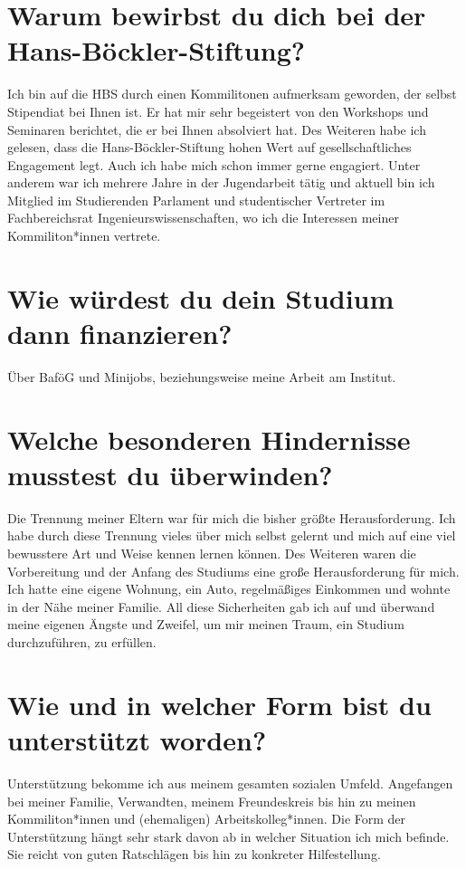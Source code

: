 \documentclass[12pt]{scrreprt}
\begin{document}
\section*{Warum bewirbst du dich bei der Hans-Böckler-Stiftung?}
Ich bin auf die HBS durch einen Kommilitonen aufmerksam geworden, der selbst Stipendiat
bei Ihnen ist. Er hat mir sehr begeistert von den Workshops und Seminaren berichtet, die er
bei Ihnen absolviert hat. Des Weiteren habe ich gelesen, dass die Hans-Böckler-Stiftung hohen
Wert auf gesellschaftliches Engagement legt. Auch ich habe mich schon immer gerne engagiert.
Unter anderem war ich mehrere Jahre in der Jugendarbeit tätig und aktuell bin ich Mitglied
im Studierenden Parlament und studentischer Vertreter im Fachbereichsrat Ingenieurswissenschaften,
wo ich die Interessen meiner Kommiliton*innen vertrete.
\section*{Wie würdest du dein Studium dann finanzieren?}
Über BaföG und Minijobs, beziehungsweise meine Arbeit am Institut.
\section*{Welche besonderen Hindernisse musstest du überwinden?}
Die Trennung meiner Eltern war für mich die bisher größte Herausforderung. Ich habe durch
diese Trennung vieles über mich selbst gelernt und mich auf eine viel bewusstere Art und Weise
kennen lernen können. Des Weiteren waren die Vorbereitung und der Anfang des Studiums
eine große Herausforderung für mich. Ich hatte eine eigene Wohnung, ein Auto, regelmäßiges
Einkommen und wohnte in der Nähe meiner Familie. All diese Sicherheiten gab ich auf und
überwand meine eigenen Ängste und Zweifel, um mir meinen Traum, ein Studium durchzuführen,
zu erfüllen.
\section*{Wie und in welcher Form bist du unterstützt worden?}
Unterstützung bekomme ich aus meinem gesamten sozialen Umfeld. Angefangen bei meiner
Familie, Verwandten, meinem Freundeskreis bis hin zu meinen Kommiliton*innen und (ehemaligen)
Arbeitskolleg*innen. Die Form der Unterstützung hängt sehr stark davon ab in welcher
Situation ich mich befinde. Sie reicht von guten Ratschlägen bis hin zu konkreter Hilfestellung.
\end{document}
